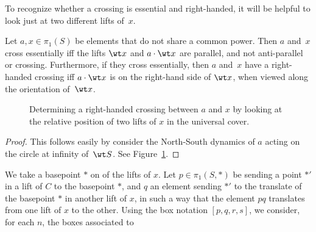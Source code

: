 
To recognize whether a crossing is essential and right-handed, it will
be helpful to look just at two different lifts of~$x$.

\begin{lemma}
  Let $a,x \in \pi_1(S)$ be elements that do not share a common power.
  Then $a$ and~$x$ cross essentially iff the lifts $\wt x$ and
  $a \cdot \wt x$ are parallel, and not anti-parallel or crossing.
  Furthermore, if they cross essentially, then $a$ and~$x$ have a
  right-handed crossing iff $a \cdot \wt x$ is on the right-hand side
  of $\wt x$, when viewed along the orientation of~$\wt x$.
  \label{lem:rhs}
\end{lemma}

  \begin{figure}
\caption{Determining a right-handed crossing between $a$ and $x$ by looking at the relative position of two lifts of $x$ in the universal cover.}
\label{fig:rhc}
\end{figure}

\begin{proof}
  This follows easily by consider the North-South dynamics of $a$
  acting on the circle at infinity of~$\wt S$. See Figure~\ref{fig:rhc}.
\end{proof}



\item We take a basepoint $*$ on of the lifts of $x$.
  Let $p \in \pi_1(S,*)$ be sending a point $*'$ in a lift of $C$ to the basepoint $*$, and $q$ an element sending $*'$ to the translate of the basepoint $*$ in another lift of $x$, in such a way that the element $pq$ translates from one lift of $x$ to the other.
    Using the box notation $[p,q,r,s]$, we consider, for each $n$, the boxes associated to
    
